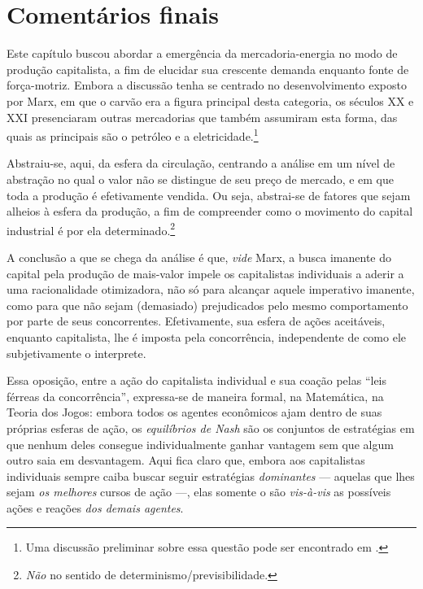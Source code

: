 \section{Comentários finais}
Este capítulo buscou abordar a emergência da mercadoria-energia no modo de produção capitalista, a fim de elucidar sua crescente demanda enquanto fonte de força-motriz. Embora a discussão tenha se centrado no desenvolvimento exposto por Marx, em que o carvão era a figura principal desta categoria, os séculos XX e XXI presenciaram outras mercadorias que também assumiram esta forma, das quais as principais são o petróleo e a eletricidade.\footnote{Uma discussão preliminar sobre essa questão pode ser encontrado em \textcite[pp. 41-61]{SaBarreto2018}.}

Abstraiu-se, aqui, da esfera da circulação, centrando a análise em um nível de abstração no qual o valor não se distingue de seu preço de mercado, e em que toda a produção é efetivamente vendida. Ou seja, abstrai-se de fatores que sejam alheios à esfera da produção, a fim de compreender como o movimento do capital industrial é por ela determinado.\footnote{\textit{Não} no sentido de determinismo/previsibilidade.} 

A conclusão a que se chega da análise é que, \textit{vide} Marx, a busca imanente do capital pela produção de mais-valor impele os capitalistas individuais a aderir a uma racionalidade otimizadora, não só para alcançar aquele imperativo imanente, como para que não sejam (demasiado) prejudicados pelo mesmo comportamento por parte de seus concorrentes. Efetivamente, sua esfera de ações aceitáveis, enquanto capitalista, lhe é imposta pela concorrência, independente de como ele subjetivamente o interprete.

Essa oposição, entre a ação do capitalista individual e sua coação pelas ``leis férreas da concorrência'', expressa-se de maneira formal, na Matemática, na Teoria dos Jogos: embora todos os agentes econômicos ajam dentro de suas próprias esferas de ação, os \textit{equilíbrios de Nash} são os conjuntos de estratégias em que nenhum deles consegue individualmente ganhar vantagem sem que algum outro saia em desvantagem. Aqui fica claro que, embora aos capitalistas individuais sempre caiba buscar seguir estratégias \textit{dominantes} --- aquelas que lhes sejam \textit{os melhores} cursos de ação ---, elas somente o são \textit{vis-à-vis} as possíveis ações e reações \textit{dos demais agentes}. 

